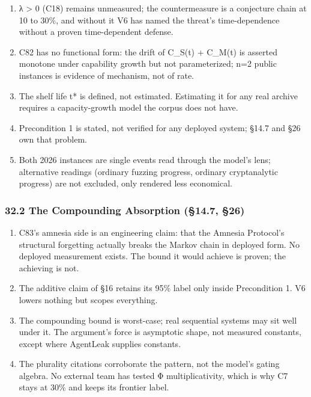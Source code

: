 \documentclass[
  11pt,
]{article}
\providecommand{\tightlist}{%
  \setlength{\itemsep}{0pt}\setlength{\parskip}{0pt}}
\begin{document}
\begin{enumerate}
\def\labelenumi{\arabic{enumi}.}
\tightlist
\item
  λ \textgreater{} 0 (C18) remains unmeasured; the countermeasure is a
  conjecture chain at 10 to 30\%, and without it V6 has named the
  threat's time-dependence without a proven time-dependent defense.
\item
  C82 has no functional form: the drift of C\_S(t) + C\_M(t) is asserted
  monotone under capability growth but not parameterized; n=2 public
  instances is evidence of mechanism, not of rate.
\item
  The shelf life t* is defined, not estimated. Estimating it for any
  real archive requires a capacity-growth model the corpus does not
  have.
\item
  Precondition 1 is stated, not verified for any deployed system; §14.7
  and §26 own that problem.
\item
  Both 2026 instances are single events read through the model's lens;
  alternative readings (ordinary fuzzing progress, ordinary
  cryptanalytic progress) are not excluded, only rendered less
  economical.
\end{enumerate}

\subsubsection{32.2 The Compounding Absorption (§14.7,
§26)}\label{the-compounding-absorption-14.7-26}

\begin{enumerate}
\def\labelenumi{\arabic{enumi}.}
\tightlist
\item
  C83's amnesia side is an engineering claim: that the Amnesia
  Protocol's structural forgetting actually breaks the Markov chain in
  deployed form. No deployed measurement exists. The bound it would
  achieve is proven; the achieving is not.
\item
  The additive claim of §16 retains its 95\% label only inside
  Precondition 1. V6 lowers nothing but scopes everything.
\item
  The compounding bound is worst-case; real sequential systems may sit
  well under it. The argument's force is asymptotic shape, not measured
  constants, except where AgentLeak supplies constants.
\item
  The plurality citations corroborate the pattern, not the model's
  gating algebra. No external team has tested Φ multiplicativity, which
  is why C7 stays at 30\% and keeps its frontier label.
\end{enumerate}
\end{document}
